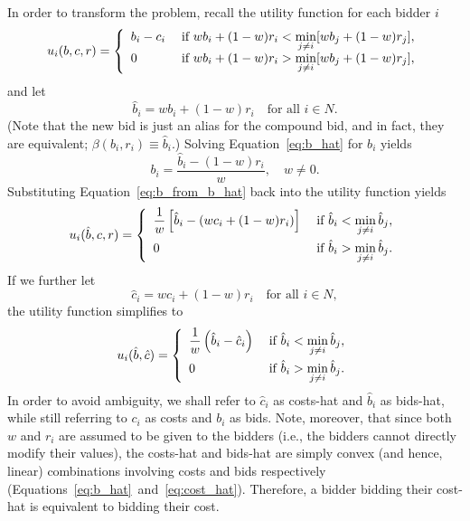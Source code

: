 In order to transform the problem, recall the utility function for each bidder $i$
\begin{equation*}
  u_i(b,c,r) = \left\{
	\begin{array}{l l}
		b_i-c_i & \;\text{if } wb_i + (1-w)r_i < \displaystyle\min_{j\neq i}[wb_j + (1-w)r_j],\\
		0 & \;\text{if } wb_i + (1-w)r_i > \displaystyle\min_{j\neq i}[wb_j + (1-w)r_j],
	\end{array}\right.
\end{equation*}
and let
\begin{equation}
  \label{eq:b_hat}
  \hat{b}_i = wb_i + (1-w)r_i \quad\text{for all } i\in N.
\end{equation}
(Note that the new bid is just an alias for the compound bid, and in fact, they are equivalent; $\beta(b_i,r_i)\equiv\hat{b}_i$.) Solving Equation~\eqref{eq:b_hat} for $b_i$ yields
\begin{equation}
  \label{eq:b_from_b_hat}
  b_i = \frac{\hat{b}_i - (1-w)r_i}{w}, \quad w\neq 0.
\end{equation}
Substituting Equation~\eqref{eq:b_from_b_hat} back into the utility function yields
\begin{equation*}
  u_i(\hat{b},c,r) = \left\{
	\begin{array}{l l}
		\displaystyle\frac{1}{w}\left[\hat{b}_i-(wc_i + (1-w)r_i)\right] & \;\text{if } \hat{b}_i < \displaystyle\min_{j\neq i}\hat{b}_j,\\[2ex]
		0 & \;\text{if } \hat{b}_i > \displaystyle\min_{j\neq i}\hat{b}_j.
	\end{array}\right.
\end{equation*}
If we further let
\begin{equation}
  \label{eq:cost_hat}
  \hat{c}_i = wc_i + (1-w)r_i \quad\text{for all } i\in N,
\end{equation}
the utility function simplifies to
\begin{equation}
  \label{eq:sellers_utility_hat}
  u_i(\hat{b},\hat{c}) = \left\{
	\begin{array}{l l}
		\displaystyle\frac{1}{w}\left(\hat{b}_i-\hat{c}_i\right) & \;\text{if } \hat{b}_i < \displaystyle\min_{j\neq i}\hat{b}_j,\\[2ex]
		0 & \;\text{if } \hat{b}_i > \displaystyle\min_{j\neq i}\hat{b}_j.
	\end{array}\right.
\end{equation}
In order to avoid ambiguity, we shall refer to $\hat{c}_i$ as costs-hat and $\hat{b}_i$ as bids-hat, while still referring to $c_i$ as costs and $b_i$ as bids. Note, moreover, that since both $w$ and $r_i$ are assumed to be given to the bidders (i.e., the bidders cannot directly modify their values), the costs-hat and bids-hat are simply convex (and hence, linear) combinations involving costs and bids respectively (Equations~\eqref{eq:b_hat}~and~\eqref{eq:cost_hat}). Therefore, a bidder bidding their cost-hat is equivalent to bidding their cost.

